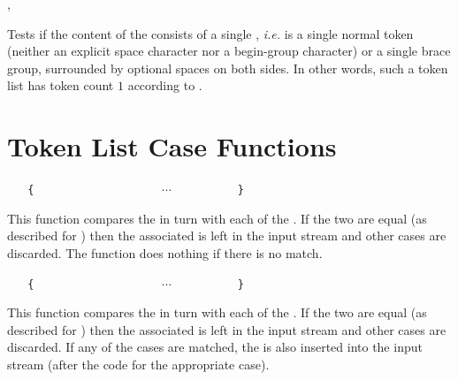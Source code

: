 \documentclass[oneside]{book}
\begin{document}
\begin{function}{\TlVarIfSingle,\TlVarIfSingleTF}
\begin{syntax}
 
   
\end{syntax}
Tests if the content of the  consists of a single ,
\emph{i.e.} is a single normal token (neither an explicit space
character nor a begin-group character) or a single brace group,
surrounded by optional spaces on both sides. In other words, such a
token list has token count $1$ according to .
\end{function}

\section{Token List Case Functions}

\begin{function}{\TlVarCase}
\begin{syntax}
 
~ ~ \verb"{"
~ ~ ~ ~  
~ ~ ~ ~  
~ ~ ~ ~ $\cdots$
~ ~ ~ ~  
~ ~ \verb"}"
\end{syntax}
This function compares the  in turn
with each of the . If the two
are equal (as described for )
then the associated  is left in the input
stream and other cases are discarded. The function
does nothing if there is no match.
\end{function}

\begin{function}{\TlVarCaseT}
\begin{syntax}
 
~ ~ \verb"{"
~ ~ ~ ~  
~ ~ ~ ~  
~ ~ ~ ~ $\cdots$
~ ~ ~ ~  
~ ~ \verb"}"
~ ~ 
\end{syntax}
This function compares the  in turn
with each of the . If the two
are equal (as described for )
then the associated  is left in the input
stream and other cases are discarded. If any of the
cases are matched, the  is also inserted into the
input stream (after the code for the appropriate case).
\end{function}
\end{document}

